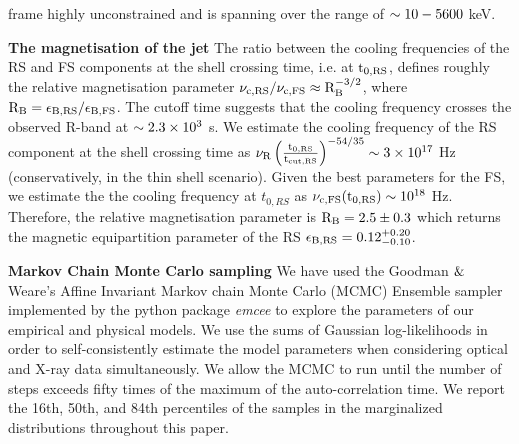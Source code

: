 \documentclass{naturesubmissionstyle}
\begin{document}
frame highly unconstrained and is spanning over the range of $\rm \sim 10-5600$ keV. 

{\noindent \bf The magnetisation of the jet} 
The ratio between the cooling frequencies of the RS and FS components at the shell crossing time, i.e. at $\rm t_{0,RS}$, defines roughly the relative magnetisation parameter $\rm \nu_{c,RS}/\nu_{c,FS} \approx R_{B}^{-3/2}$, where $\rm R_{B} = \epsilon_{B,RS}/\epsilon_{B,FS}$\cite{Zhang2003,Kobayashi2003}. The cutoff time suggests that the cooling frequency crosses the observed R-band at $\rm \sim 2.3 \times 10^{3}$ s. We estimate the cooling frequency of the RS component at the shell crossing time\cite{Kobayashi2000} as $\rm \nu_{R} \left(\frac{t_{0,RS}}{t_{cut,RS}} \right)^{-54/35} \sim 3 \times 10^{17}$ Hz (conservatively, in the thin shell scenario). Given the best parameters for the FS, we estimate the the cooling frequency 
at $t_{0,RS}$ as $\rm \nu_{c,FS}(t_{0,RS}) \sim 10^{18}$ Hz. Therefore, the relative magnetisation parameter is $\rm R_{B} = 2.5 \pm 0.3$ which returns the magnetic equipartition parameter of the RS $\rm \epsilon_{B,RS} = 0.12_{-0.10}^{+0.20}$. 

{\noindent \bf Markov Chain Monte Carlo sampling}
We have used the Goodman $\rm \&$ Weare’s Affine Invariant Markov chain Monte Carlo (MCMC) Ensemble sampler\cite{Goodman2010} implemented by the python package {\it emcee}\cite{Foreman-Mackey2013} to explore the parameters of our empirical and physical models. We use the sums of Gaussian log-likelihoods in order to self-consistently estimate the model parameters when considering optical and X-ray data simultaneously. We allow the MCMC to run until the number of steps exceeds fifty times of the maximum of the auto-correlation time. We report the 16th, 50th, and 84th percentiles of the samples in the marginalized distributions throughout this paper.  


\end{document}
